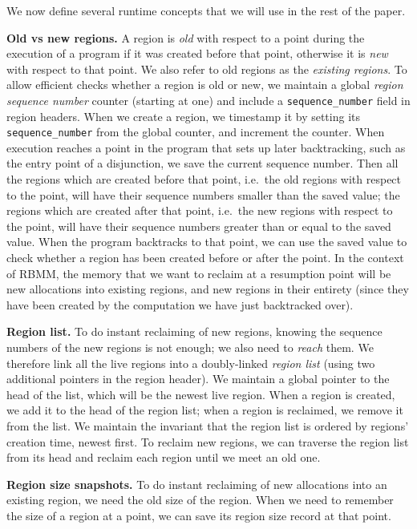 \documentclass{tlp}
\newcommand{\code}[1]{{\tt#1}}
\begin{document}
We now define several runtime concepts
that we will use in the rest of the paper.

\noindent\textbf{Old vs new regions.}
A region is \emph{old} with respect to a point
during the execution of a program if it was created before that point,
otherwise it is \emph{new} with respect to that point.
We also refer to old regions as the \emph{existing regions}.
To allow efficient checks whether a region is old or new,
we maintain a global \emph{region sequence number} counter (starting at one)
and include a \code{sequence\_number} field in region headers.
When we create a region,
we timestamp it by setting its \code{sequence\_number} from the global counter,
and increment the counter.
When execution reaches a point in the program that sets up later backtracking,
such as the entry point of a disjunction,
we save the current sequence number.
Then all the regions which are created before that point,
i.e.\ the old regions with respect to the point,
will have their sequence numbers smaller than the saved value;
the regions which are created after that point,
i.e.\ the new regions with respect to the point,
will have their sequence numbers greater than or equal to the saved value.
When the program backtracks to that point, we can use the saved value
to check whether a region has been created before or after the point.
In the context of RBMM,
the memory that we want to reclaim at a resumption point
will be new allocations into existing regions,
and new regions in their entirety
(since they have been created
by the computation we have just backtracked over).

\noindent\textbf{Region list.}
To do instant reclaiming of new regions,
knowing the sequence numbers of the new regions is not enough;
we also need to \emph{reach} them.
We therefore link all the live regions into a doubly-linked \emph{region list}
(using two additional pointers in the region header).
We maintain a global pointer to the head of the list,
which will be the newest live region.
When a region is created, we add it to the head of the region list;
when a region is reclaimed, we remove it from the list.
We maintain the invariant that
the region list is ordered by regions' creation time, newest first.
To reclaim new regions,
we can traverse the region list from its head
and reclaim each region until we meet an old one.

\noindent\textbf{Region size snapshots.}
To do instant reclaiming of new allocations into an existing region,
we need the old size of the region.
When we need to remember the size of a region at a point,
we can save its region size record at that point.
\end{document}
